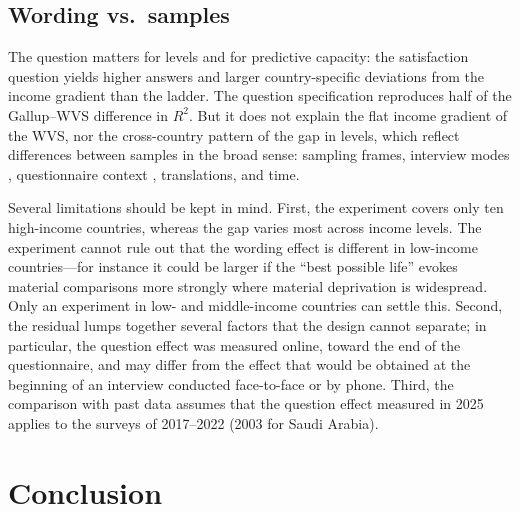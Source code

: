 \documentclass[12pt]{article}
\begin{document}
\subsection{Wording vs.\ samples}
The question matters for levels and for predictive capacity: the satisfaction question yields higher answers and larger country-specific deviations from the income gradient than the ladder. The question specification reproduces half of the Gallup--WVS difference in $R^2$. 
But it does not explain the flat income gradient of the WVS, nor the cross-country pattern of the gap in levels, which reflect differences between samples in the broad sense: sampling frames, interview modes \citep{dolan_happy_2016,conti_survey_2011}, questionnaire context \citep{deaton_financial_2012,deaton_understanding_2016}, translations, and time.

Several limitations should be kept in mind. First, the experiment covers only ten high-income countries, whereas the gap varies most across income levels.  %
The experiment cannot rule out that the wording effect is different in low-income countries---for instance it could be larger if the ``best possible life'' evokes material comparisons more strongly where material deprivation is widespread. Only an experiment in low- and middle-income countries can settle this. Second, the residual lumps together several factors that the design cannot separate; in particular, the question effect was measured online, toward the end of the questionnaire, and may differ from the effect that would be obtained at the beginning of an interview conducted face-to-face or by phone. Third, the comparison with past data assumes that the question effect measured in 2025 applies to the surveys of 2017--2022 (2003 for Saudi Arabia).


\section{Conclusion}\label{sec:conclusion}
\end{document}
